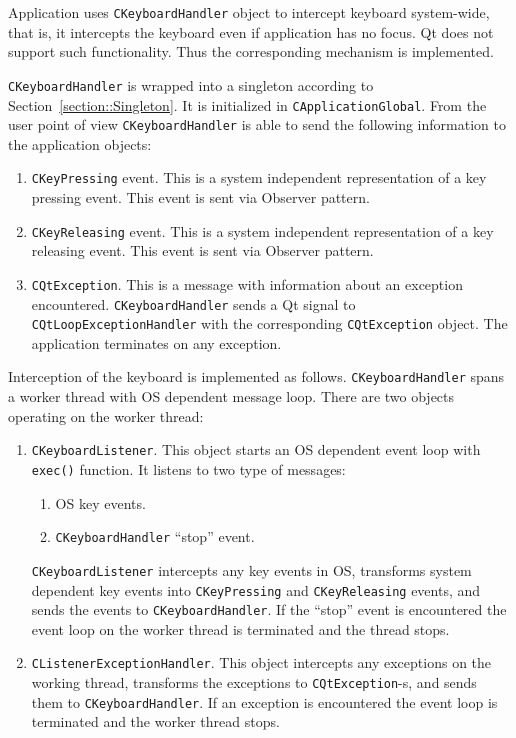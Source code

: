 \documentclass{article}
\begin{document}
Application uses \verb"CKeyboardHandler" object to intercept keyboard system-wide, that is, it intercepts the keyboard even if application has no focus. Qt does not support such functionality. Thus the corresponding mechanism is implemented.

\verb"CKeyboardHandler" is wrapped into a singleton according to Section~\ref{section::Singleton}. It is initialized in \verb"CApplicationGlobal". From the user point of view \verb"CKeyboardHandler" is able to send the following information to the application objects:
\begin{enumerate}
\item \verb"CKeyPressing" event. This is a system independent representation of a key pressing event. This event is sent via Observer pattern.

\item \verb"CKeyReleasing" event. This is a system independent representation of a key releasing event. This event is sent via Observer pattern.

\item \verb"CQtException". This is a message with information about an exception encountered. \verb"CKeyboardHandler" sends a Qt signal to \verb"CQtLoopExceptionHandler" with the corresponding \verb"CQtException" object. The application terminates on any exception.
\end{enumerate}

Interception of the keyboard is implemented as follows. \verb"CKeyboardHandler" spans a worker thread with OS dependent message loop. There are two objects operating on the worker thread:
\begin{enumerate}
\item \verb"CKeyboardListener". This object starts an OS dependent event loop with \verb"exec()" function. It listens to two type of messages:
\begin{enumerate}
\item OS key events.
\item \verb"CKeyboardHandler" ``stop'' event.
\end{enumerate}
\verb"CKeyboardListener" intercepts any key events in OS, transforms system dependent key events into \verb"CKeyPressing" and \verb"CKeyReleasing" events, and sends the events to \verb"CKeyboardHandler". If the ``stop'' event is encountered the event loop on the worker thread is terminated and the thread stops.

\item \verb"CListenerExceptionHandler". This object intercepts any exceptions on the working thread, transforms the exceptions to \verb"CQtException"-s, and sends them to \verb"CKeyboardHandler". If an exception is encountered the event loop is terminated and the worker thread stops.
\end{enumerate}
\end{document}
